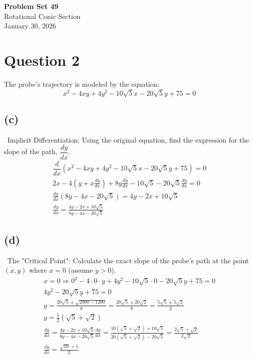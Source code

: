 \documentclass[12pt]{article}
\newcommand{\dydx}{\frac{dy}{dx}}
\begin{document}
\vspace*{0cm}

\begin{center}
    {\Large \bfseries Problem Set 49} \\[0.5cm]
    {\large Rotational Conic Section} \\[0.35cm]
    {\normalsize January 30, 2026}
\end{center}


\section{Question 2}
The probe's trajectory is modeled by the equation:
\[
x^2-4xy+4y^2-10\sqrt{5}x-20\sqrt{5}y+75=0
\]

\subsection{(c)} \, Implicit Differentiation: Using the original equation, find the expression for the slope of the path, $\dfrac{dy}{dx}$.
\begin{gather*}
\dfrac{d}{dx}(x^2-4xy+4y^2-10\sqrt{5}x-20\sqrt{5}y+75)=0 \\
2x-4(y+x\dydx)+8y\dydx-10\sqrt{5}-20\sqrt{5}\dydx=0 \\
\dydx(8y-4x-20\sqrt{5})=4y-2x+10\sqrt{5} \\
\boxed{\dydx=\frac{4y-2x+10\sqrt{5}}{8y-4x-20\sqrt{5}}}
\end{gather*}

\subsection{(d)} \, The "Critical Point": Calculate the exact slope of the probe's path at the point $(x,y)$ where $x=0$ (assume $y>0$).
\begin{gather*}
x=0 \Rightarrow 0^2-4\cdot0\cdot y+4y^2-10\sqrt{5}\cdot0 -20\sqrt{5}y+75=0\\
4y^2-20\sqrt5y+75=0\\
y=\frac{20\sqrt5 \pm \sqrt{2000-1200}}{8}=\frac{20\sqrt{5}\pm20\sqrt{2}}{8}=\frac{5\sqrt{5}\pm5\sqrt{2}}{2}\\
y=\frac{5}{2}(\sqrt{5}+\sqrt{2})\\
\dydx=\frac{4y-2x+10\sqrt{5}}{8y-4x-20\sqrt{5}}
\dydx=\frac{10(\sqrt{5}+\sqrt{2})+10\sqrt{5}}{20(\sqrt{5}+\sqrt{2})-20\sqrt{5}}=\frac{2\sqrt{5}+\sqrt{2}}{2\sqrt{2}}\\
\boxed{\dydx=\frac{\sqrt{10}+1}{2}}
\end{gather*}
\end{document}
